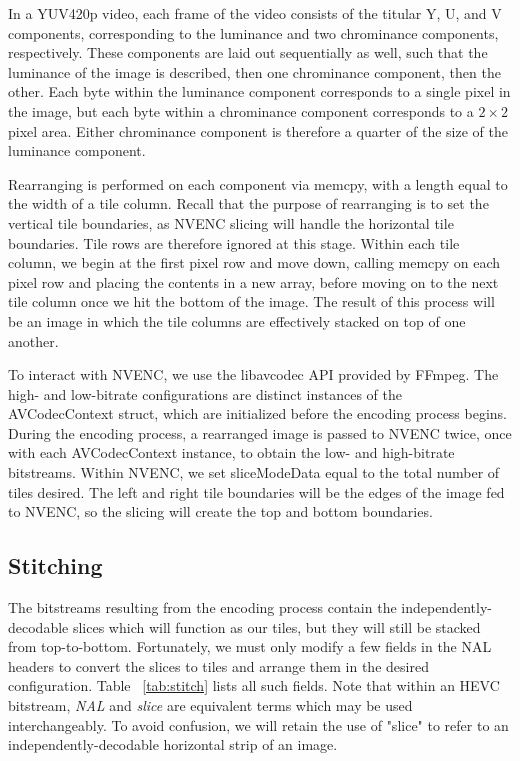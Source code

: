 In a YUV420p video, each frame of the video consists of the titular Y, U, and V components, corresponding to the luminance and two chrominance components, respectively. These components are laid out sequentially as well, such that the luminance of the image is described, then one chrominance component, then the other. Each byte within the luminance component corresponds to a single pixel in the image, but each byte within a chrominance component corresponds to a $2\times2$ pixel area. Either chrominance component is therefore a quarter of the size of the luminance component. 

Rearranging is performed on each component via memcpy, with a length equal to the width of a tile column. Recall that the purpose of rearranging is to set the vertical tile boundaries, as NVENC slicing will handle the horizontal tile boundaries. Tile rows are therefore ignored at this stage. Within each tile column, we begin at the first pixel row and move down, calling memcpy on each pixel row and placing the contents in a new array, before moving on to the next tile column once we hit the bottom of the image. The result of this process will be an image in which the tile columns are effectively stacked on top of one another.

To interact with NVENC, we use the libavcodec API provided by FFmpeg. The high- and low-bitrate configurations are distinct instances of the AVCodecContext struct, which are initialized before the encoding process begins. During the encoding process, a rearranged image is passed to NVENC twice, once with each AVCodecContext instance, to obtain the low- and high-bitrate bitstreams. Within NVENC, we set sliceModeData equal to the total number of tiles desired. The left and right tile boundaries will be the edges of the image fed to NVENC, so the slicing will create the top and bottom boundaries.

\subsection{Stitching}
The bitstreams resulting from the encoding process contain the independently-decodable slices which will function as our tiles, but they will still be stacked from top-to-bottom. Fortunately, we must only modify a few fields in the NAL headers to convert the slices to tiles and arrange them in the desired configuration. Table ~\ref{tab:stitch} lists all such fields. Note that within an HEVC bitstream, \textit{NAL} and \textit{slice} are equivalent terms which may be used interchangeably. To avoid confusion, we will retain the use of "slice" to refer to an independently-decodable horizontal strip of an image.

